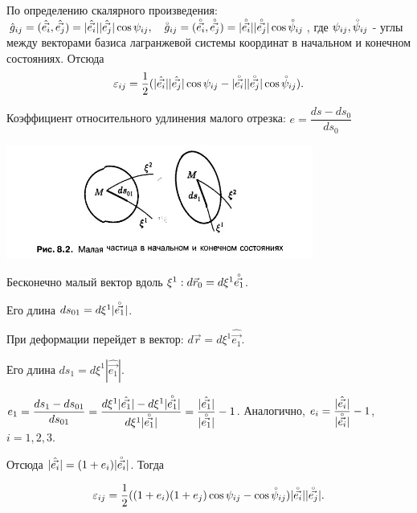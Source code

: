 По определению скалярного произведения: $\hat g_{ij} = (\hat{\vec{e_i}}, \hat{\vec{e_j}}) = |\hat{\vec{e_i}}||\hat{\vec{e_j}}|\cos\psi_{ij}, \quad \accentset{\circ}{g}_{ij} = (\accentset{\circ}{\vec{e_i}}, \accentset{\circ}{\vec{e_j}}) = |\accentset{\circ}{\vec{e_i}}||\accentset{\circ}{\vec{e_j}}|\cos\accentset{\circ}{\psi}_{ij}$, где $\psi_{ij}, \accentset{\circ}{\psi}_{ij}$ - углы между векторами базиса лагранжевой системы координат в начальном и конечном состояниях. Отсюда
$$
\varepsilon_{ij} = \frac{1}{2}(|\hat{\vec{e_i}}||\hat{\vec{e_j}}|\cos\psi_{ij} - |\accentset{\circ}{\vec{e_i}}||\accentset{\circ}{\vec{e_j}}|\cos\accentset{\circ}{\psi}_{ij}).
$$

Коэффициент относительного удлинения малого отрезка: $e = \dfrac{ds - ds_0}{ds_0}$

\noindent
\parbox[b][4cm][t]{10mm}{
	\includegraphics[height=3.75cm]{3/3_3.jpg}}
\hfill
\parbox[b][4cm][t]{68mm}{
	Бесконечно малый вектор вдоль $\xi^1: d\vec r_0 = d\xi^1\accentset{\circ}{\vec{e_1}}$. 
	
	Его длина $ds_{01} = d\xi^1|\accentset{\circ}{\vec{e_1}}|$.
	
	При деформации перейдет в вектор: $d\vec r = d\xi^1\hat{\vec{e_1}}$. 
	
	Его длина $ds_{1} = d\xi^1|\hat{\vec{e_1}}|$.
	
	
}

\hfill

$e_1 = \dfrac{ds_1 - ds_{01}}{ds_{01}} = \dfrac{d\xi^1|\hat{\vec{e_1}}| - d\xi^1|\accentset{\circ}{\vec{e_1}}|}{d\xi^1|\accentset{\circ}{\vec{e_1}}|} = \dfrac{|\hat{\vec{e_1}}|}{|\accentset{\circ}{\vec{e_1}}|} - 1$. Аналогично, $e_i = \dfrac{|\hat{\vec{e_i}}|}{|\accentset{\circ}{\vec{e_i}}|} - 1$, $i = 1,2,3$.

Отсюда $|\hat{\vec{e_i}}| = (1+e_i)|\accentset{\circ}{\vec{e_i}}|$. Тогда

$$
\varepsilon_{ij} = \dfrac{1}{2}((1+e_i)(1+e_j)\cos\psi_{ij} - \cos\accentset{\circ}{\psi}_{ij})|\accentset{\circ}{\vec{e_i}}||\accentset{\circ}{\vec{e_j}}|.
$$

